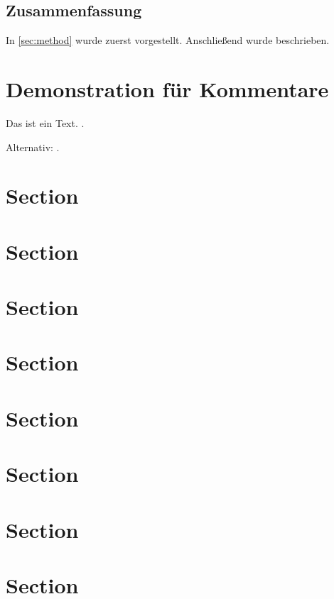 \documentclass[paper=a5,twoside,fontsize=10pt, DIV=calc, headings=small, bibliography=totoc, listof=totoc]{scrbook}
\begin{document}
\label{sec:rqa}
\blindtext

\blindtext

\subsection{Zusammenfassung}
In \cref{sec:method} wurde zuerst  vorgestellt.
Anschließend wurde  beschrieben.

\section{Demonstration für Kommentare}
Das ist ein Text.
.

Alternativ: .


\section{Section}

\section{Section}

\section{Section}

\section{Section}

\section{Section}

\section{Section}

\section{Section}

\section{Section}
\end{document}
